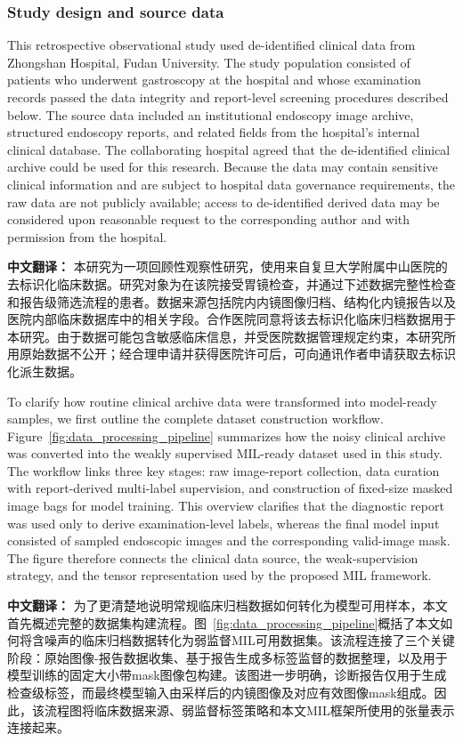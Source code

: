 \documentclass[Afour,sagev,times]{sagej}
\begin{document}
\subsubsection{Study design and source data}
This retrospective observational study used de-identified clinical data from Zhongshan Hospital, Fudan University. The study population consisted of patients who underwent gastroscopy at the hospital and whose examination records passed the data integrity and report-level screening procedures described below. The source data included an institutional endoscopy image archive, structured endoscopy reports, and related fields from the hospital's internal clinical database. The collaborating hospital agreed that the de-identified clinical archive could be used for this research. Because the data may contain sensitive clinical information and are subject to hospital data governance requirements, the raw data are not publicly available; access to de-identified derived data may be considered upon reasonable request to the corresponding author and with permission from the hospital.

\textbf{中文翻译：} 本研究为一项回顾性观察性研究，使用来自复旦大学附属中山医院的去标识化临床数据。研究对象为在该院接受胃镜检查，并通过下述数据完整性检查和报告级筛选流程的患者。数据来源包括院内内镜图像归档、结构化内镜报告以及医院内部临床数据库中的相关字段。合作医院同意将该去标识化临床归档数据用于本研究。由于数据可能包含敏感临床信息，并受医院数据管理规定约束，本研究所用原始数据不公开；经合理申请并获得医院许可后，可向通讯作者申请获取去标识化派生数据。

To clarify how routine clinical archive data were transformed into model-ready samples, we first outline the complete dataset construction workflow. Figure~\ref{fig:data_processing_pipeline} summarizes how the noisy clinical archive was converted into the weakly supervised MIL-ready dataset used in this study. The workflow links three key stages: raw image-report collection, data curation with report-derived multi-label supervision, and construction of fixed-size masked image bags for model training. This overview clarifies that the diagnostic report was used only to derive examination-level labels, whereas the final model input consisted of sampled endoscopic images and the corresponding valid-image mask. The figure therefore connects the clinical data source, the weak-supervision strategy, and the tensor representation used by the proposed MIL framework.

\textbf{中文翻译：} 为了更清楚地说明常规临床归档数据如何转化为模型可用样本，本文首先概述完整的数据集构建流程。图~\ref{fig:data_processing_pipeline}概括了本文如何将含噪声的临床归档数据转化为弱监督MIL可用数据集。该流程连接了三个关键阶段：原始图像-报告数据收集、基于报告生成多标签监督的数据整理，以及用于模型训练的固定大小带mask图像包构建。该图进一步明确，诊断报告仅用于生成检查级标签，而最终模型输入由采样后的内镜图像及对应有效图像mask组成。因此，该流程图将临床数据来源、弱监督标签策略和本文MIL框架所使用的张量表示连接起来。
\end{document}
